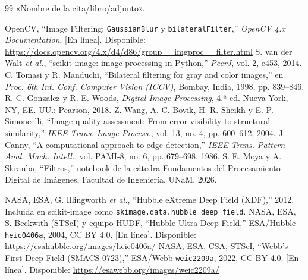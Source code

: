 \documentclass[11 pt,a4paper]{article}
\begin{document}
    

    \tableofcontents

    \newpage 
    \newpage 
    \newpage 
    \newpage 

    \newpage 

    \begin{thebibliography}{99} %
            «Nombre de la cita/libro/adjunto».

            OpenCV, ``Image Filtering: \texttt{GaussianBlur} y \texttt{bilateralFilter},'' \textit{OpenCV 4.x Documentation}. [En línea]. Disponible: \url{https://docs.opencv.org/4.x/d4/d86/group__imgproc__filter.html}
            S. van der Walt \textit{et al.}, ``scikit-image: image processing in Python,'' \textit{PeerJ}, vol. 2, e453, 2014.
            C. Tomasi y R. Manduchi, ``Bilateral filtering for gray and color images,'' en \textit{Proc. 6th Int. Conf. Computer Vision (ICCV)}, Bombay, India, 1998, pp. 839--846.
            R. C. Gonzalez y R. E. Woods, \textit{Digital Image Processing}, 4.ª ed. Nueva York, NY, EE. UU.: Pearson, 2018.
            Z. Wang, A. C. Bovik, H. R. Sheikh y E. P. Simoncelli, ``Image quality assessment: From error visibility to structural similarity,'' \textit{IEEE Trans. Image Process.}, vol. 13, no. 4, pp. 600--612, 2004.
            J. Canny, ``A computational approach to edge detection,'' \textit{IEEE Trans. Pattern Anal. Mach. Intell.}, vol. PAMI-8, no. 6, pp. 679--698, 1986.
            S. E. Moya y A. Skrauba, ``Filtros,'' notebook de la cátedra Fundamentos del Procesamiento Digital de Imágenes, Facultad de Ingeniería, UNaM, 2026.

            NASA, ESA, G. Illingworth \textit{et al.}, ``Hubble eXtreme Deep Field (XDF),'' 2012. Incluida en scikit-image como \texttt{skimage.data.hubble\_deep\_field}.
            NASA, ESA, S. Beckwith (STScI) y equipo HUDF, ``Hubble Ultra Deep Field,'' ESA/Hubble \texttt{heic0406a}, 2004, CC BY 4.0. [En línea]. Disponible: \url{https://esahubble.org/images/heic0406a/}
            NASA, ESA, CSA, STScI, ``Webb's First Deep Field (SMACS 0723),'' ESA/Webb \texttt{weic2209a}, 2022, CC BY 4.0. [En línea]. Disponible: \url{https://esawebb.org/images/weic2209a/}
    \end{thebibliography}
        
\end{document}
